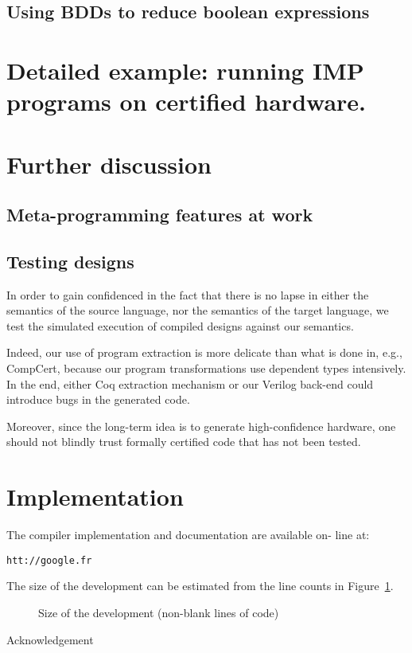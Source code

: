 \documentclass[preprint]{sigplanconf}
\begin{document}
\subsection{Using BDDs to reduce boolean expressions}

\section{Detailed example: running IMP programs on certified
  hardware.}

\section{Further discussion}

\subsection{Meta-programming features at work}

\subsection{Testing designs}
In order to gain confidenced in the fact that there is no lapse in
either the semantics of the source language, nor the semantics of the
target language, we test the simulated execution of compiled designs
against our semantics. 

Indeed, our use of program extraction is more delicate than what is
done in, e.g., CompCert, because our program transformations use
dependent types intensively. In the end, either Coq extraction
mechanism or our Verilog back-end could introduce bugs in the
generated code.

Moreover, since the long-term idea is to generate high-confidence
hardware, one should not blindly trust formally certified code that
has not been tested.

\section{Implementation}
The compiler implementation and documentation are available on- line
at: 
%
\begin{center}
  \texttt{htt://google.fr}
\end{center}
%
The size of the development can be estimated from the line counts in
Figure~\ref{fig:loc}.
\begin{figure}
  \centering  
  \caption{Size of the development (non-blank lines of code)}
  \label{fig:loc}
\end{figure}






\acks Acknowledgement



\end{document}

